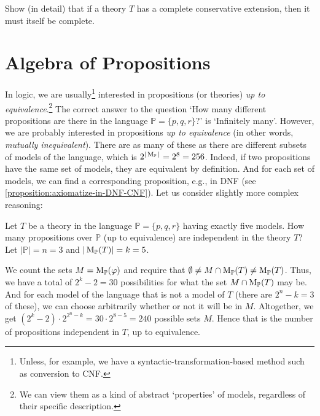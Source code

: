 \begin{exercise}
    Show (in detail) that if a theory $T$ has a complete conservative extension, then it must itself be complete.
\end{exercise}


\section{Algebra of Propositions}

In logic, we are usually\footnote{Unless, for example, we have a syntactic-transformation-based method such as conversion to CNF.} interested in propositions (or theories) \emph{up to equivalence}.\footnote{We can view them as a kind of abstract `properties' of models, regardless of their specific description.} The correct answer to the question `How many different propositions are there in the language $\mathbb{P} = \{p, q, r\}$?' is `Infinitely many'. However, we are probably interested in propositions \emph{up to equivalence} (in other words, \emph{mutually inequivalent}). There are as many of these as there are different subsets of models of the language, which is $2^{|\operatorname{M}_\mathbb{P}|} = 2^8 = 256$. Indeed, if two propositions have the same set of models, they are equivalent by definition. And for each set of models, we can find a corresponding proposition, e.g., in DNF (see \ref{proposition:axiomatize-in-DNF-CNF}). Let us consider slightly more complex reasoning:

\begin{example}
    Let $T$ be a theory in the language $\mathbb{P} = \{p, q, r\}$ having exactly five models. How many propositions over $\mathbb{P}$ (up to equivalence) are independent in the theory $T$? Let $|\mathbb{P}| = n = 3$ and $|\operatorname{M}_\mathbb{P}(T)| = k = 5$.

    We count the sets $M = \operatorname{M}_\mathbb{P}(\varphi)$ and require that $\emptyset \neq M \cap \operatorname{M}_\mathbb{P}(T) \neq \operatorname{M}_\mathbb{P}(T)$. Thus, we have a total of $2^k - 2 = 30$ possibilities for what the set $M \cap \operatorname{M}_\mathbb{P}(T)$ may be. And for each model of the language that is not a model of $T$ (there are $2^n - k = 3$ of these), we can choose arbitrarily whether or not it will be in $M$. Altogether, we get $(2^k - 2) \cdot 2^{2^n - k} = 30 \cdot 2^{8 - 5} = 240$ possible sets $M$. Hence that is the number of propositions independent in $T$, up to equivalence.
\end{example}

